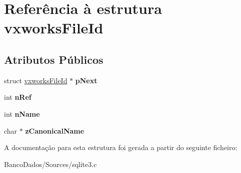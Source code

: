 \hypertarget{structvxworks_file_id}{\section{Referência à estrutura vxworks\-File\-Id}
\label{structvxworks_file_id}
}
\subsection*{Atributos Públicos}
\begin{DoxyCompactItemize}
\item 
\hypertarget{structvxworks_file_id_a1941104384e7aa1ad9d8574d091abe3a}{struct \hyperlink{structvxworks_file_id}{vxworks\-File\-Id} $\ast$ {\bfseries p\-Next}}\label{structvxworks_file_id_a1941104384e7aa1ad9d8574d091abe3a}

\item 
\hypertarget{structvxworks_file_id_a59dde49ee027786a06de8ad59b1d7883}{int {\bfseries n\-Ref}}\label{structvxworks_file_id_a59dde49ee027786a06de8ad59b1d7883}

\item 
\hypertarget{structvxworks_file_id_af7ed9a749d73b74b534bc06baf1abf6d}{int {\bfseries n\-Name}}\label{structvxworks_file_id_af7ed9a749d73b74b534bc06baf1abf6d}

\item 
\hypertarget{structvxworks_file_id_a032c9aaaa13ff100d9f3cd53926587fe}{char $\ast$ {\bfseries z\-Canonical\-Name}}\label{structvxworks_file_id_a032c9aaaa13ff100d9f3cd53926587fe}

\end{DoxyCompactItemize}


A documentação para esta estrutura foi gerada a partir do seguinte ficheiro\-:\begin{DoxyCompactItemize}
\item 
Banco\-Dados/\-Sources/sqlite3.\-c\end{DoxyCompactItemize}
